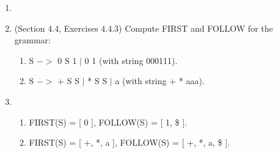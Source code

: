 \documentclass[12pt,a4paper]{article}
\makeatletter
\newtheorem*{solution}{Solution}
\renewenvironment{solution}[1][Solution] {\par\pushQED{\qed}\normalfont\topsep6\p@\@plus6\p@\relax\trivlist\item[\hskip\labelsep\bfseries#1\@addpunct{.}]\ignorespaces}{\popQED\endtrivlist\@endpefalse} \makeatother
\makeatother
\begin{document}
\begin{enumerate}
\begin{solution}
\end{solution}

\newpage
\textrm{\\}

\item (Section 4.4, Exercises 4.4.3) Compute FIRST and FOLLOW for the grammar:
    
        \begin{enumerate}
        \item S $->$ 0 S 1 $|$ 0 1 (with string 000111).
        \item S $->$ + S S $|$ * S S $|$ a (with string + * aaa).
        \end{enumerate}


\begin{solution}
    
    \textrm{\\}
    \begin{enumerate}
    \item FIRST(S) = [ 0 ],    FOLLOW(S) = [ 1, \$ ].
    \item FIRST(S) = [ +, *, a ],   FOLLOW(S) = [ +, *, a, \$ ].  
    \end{enumerate}

\end{solution}

\end{enumerate}
\end{document}
